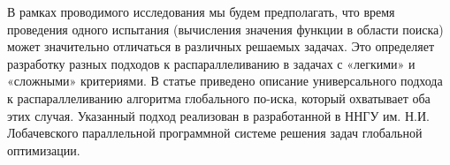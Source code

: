 В рамках проводимого исследования мы будем предполагать, что время проведения одного испытания (вычисления значения функции в области поиска) может значительно отличаться в различных решаемых задачах. Это определяет разработку разных подходов к распараллеливанию в задачах с «легкими» и «сложными» критериями. В статье приведено описание универсального подхода к распараллеливанию алгоритма глобального по-иска, который охватывает оба этих случая. Указанный подход реализован в разработанной в ННГУ им. Н.И. Лобачевского параллельной программной системе решения задач глобальной оптимизации.

